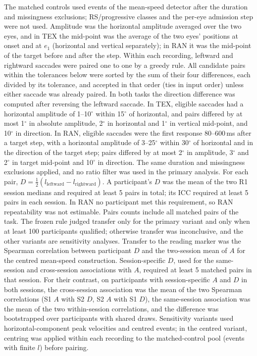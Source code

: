 The matched controls used events of the mean-speed detector after the duration and missingness exclusions; RS/progressive classes and the per-eye admission step were not used. Amplitude was the horizontal amplitude averaged over the two eyes, and in TEX the mid-point was the average of the two eyes' positions at onset and at $e_1$ (horizontal and vertical separately); in RAN it was the mid-point of the target before and after the step. Within each recording, leftward and rightward saccades were paired one to one by a greedy rule. All candidate pairs within the tolerances below were sorted by the sum of their four differences, each divided by its tolerance, and accepted in that order (ties in input order) unless either saccade was already paired. In both tasks the direction difference was computed after reversing the leftward saccade. In TEX, eligible saccades had a horizontal amplitude of 1--10$^\circ$ within 15$^\circ$ of horizontal, and pairs differed by at most 1$^\circ$ in absolute amplitude, 2$^\circ$ in horizontal and 1$^\circ$ in vertical mid-point, and 10$^\circ$ in direction. In RAN, eligible saccades were the first response 80--600\,ms after a target step, with a horizontal amplitude of 3--25$^\circ$ within 30$^\circ$ of horizontal and in the direction of the target step; pairs differed by at most 2$^\circ$ in amplitude, 3$^\circ$ and 2$^\circ$ in target mid-point and 10$^\circ$ in direction. The same duration and missingness exclusions applied, and no ratio filter was used in the primary analysis. For each pair, $D = \tfrac12(l_{\mathrm{leftward}} - l_{\mathrm{rightward}})$. A participant's $D$ was the mean of the two R1 session medians and required at least 5 pairs in total; its ICC required at least 5 pairs in each session. In RAN no participant met this requirement, so RAN repeatability was not estimable. Pairs counts include all matched pairs of the task. The frozen rule judged transfer only for the primary variant and only when at least 100 participants qualified; otherwise transfer was inconclusive, and the other variants are sensitivity analyses. Transfer to the reading marker was the Spearman correlation between participant $D$ and the two-session mean of $A$ for the centred mean-speed construction. Session-specific $D$, used for the same-session and cross-session associations with $A$, required at least 5 matched pairs in that session. For their contrast, on participants with session-specific $A$ and $D$ in both sessions, the cross-session association was the mean of the two Spearman correlations (S1 $A$ with S2 $D$, S2 $A$ with S1 $D$), the same-session association was the mean of the two within-session correlations, and the difference was bootstrapped over participants with shared draws. Sensitivity variants used horizontal-component peak velocities and centred events; in the centred variant, centring was applied within each recording to the matched-control pool (events with finite $l$) before pairing.

